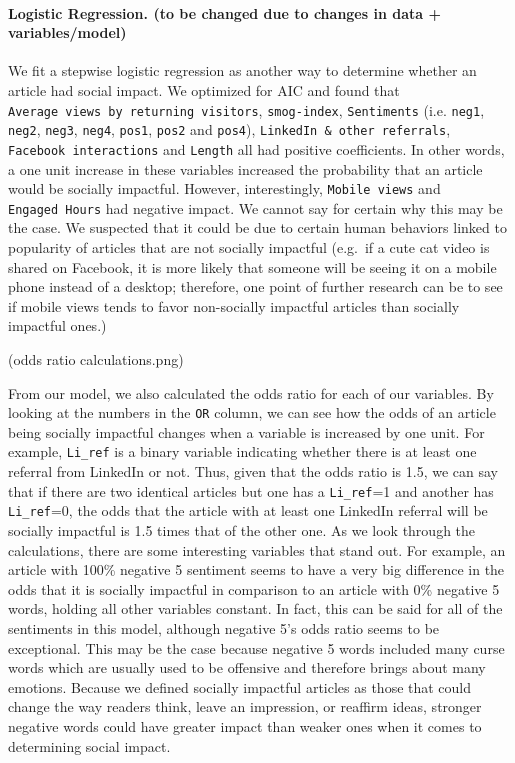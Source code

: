\documentclass[10pt,letterpaper]{article}
\begin{document}
\hypertarget{logistic-regression.-to-be-changed-due-to-changes-in-data-variablesmodel}{%
\paragraph{Logistic Regression. (to be changed due to changes in data +
variables/model)}\label{logistic-regression.-to-be-changed-due-to-changes-in-data-variablesmodel}}

We fit a stepwise logistic regression as another way to determine
whether an article had social impact. We optimized for AIC and found
that \texttt{Average\ views\ by\ returning\ visitors},
\texttt{smog-index}, \texttt{Sentiments} (i.e. \texttt{neg1},
\texttt{neg2}, \texttt{neg3}, \texttt{neg4}, \texttt{pos1},
\texttt{pos2} and \texttt{pos4}),
\texttt{LinkedIn\ \&\ other\ referrals}, \texttt{Facebook\ interactions}
and \texttt{Length} all had positive coefficients. In other words, a one
unit increase in these variables increased the probability that an
article would be socially impactful. However, interestingly,
\texttt{Mobile\ views} and \texttt{Engaged\ Hours} had negative impact.
We cannot say for certain why this may be the case. We suspected that it
could be due to certain human behaviors linked to popularity of articles
that are not socially impactful (e.g.~if a cute cat video is shared on
Facebook, it is more likely that someone will be seeing it on a mobile
phone instead of a desktop; therefore, one point of further research can
be to see if mobile views tends to favor non-socially impactful articles
than socially impactful ones.)

(odds ratio calculations.png)

From our model, we also calculated the odds ratio for each of our
variables. By looking at the numbers in the \texttt{OR} column, we can
see how the odds of an article being socially impactful changes when a
variable is increased by one unit. For example, \texttt{Li\_ref} is a
binary variable indicating whether there is at least one referral from
LinkedIn or not. Thus, given that the odds ratio is 1.5, we can say that
if there are two identical articles but one has a \texttt{Li\_ref}=1 and
another has \texttt{Li\_ref}=0, the odds that the article with at least
one LinkedIn referral will be socially impactful is 1.5 times that of
the other one. As we look through the calculations, there are some
interesting variables that stand out. For example, an article with 100\%
negative 5 sentiment seems to have a very big difference in the odds
that it is socially impactful in comparison to an article with 0\%
negative 5 words, holding all other variables constant. In fact, this
can be said for all of the sentiments in this model, although negative
5's odds ratio seems to be exceptional. This may be the case because
negative 5 words included many curse words which are usually used to be
offensive and therefore brings about many emotions. Because we defined
socially impactful articles as those that could change the way readers
think, leave an impression, or reaffirm ideas, stronger negative words
could have greater impact than weaker ones when it comes to determining
social impact.
\end{document}
